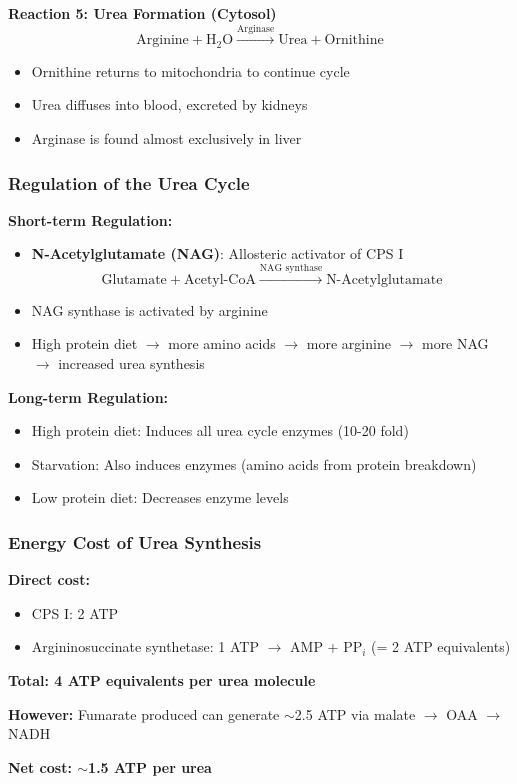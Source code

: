 \textbf{Reaction 5: Urea Formation (Cytosol)}
\[
\text{Arginine} + \text{H}_2\text{O} \xrightarrow{\text{Arginase}} \text{Urea} + \text{Ornithine}
\]
\begin{itemize}
    \item Ornithine returns to mitochondria to continue cycle
    \item Urea diffuses into blood, excreted by kidneys
    \item Arginase is found almost exclusively in liver
\end{itemize}

\subsubsection{Regulation of the Urea Cycle}

\textbf{Short-term Regulation:}
\begin{itemize}
    \item \textbf{N-Acetylglutamate (NAG)}: Allosteric activator of CPS I
    \[
    \text{Glutamate} + \text{Acetyl-CoA} \xrightarrow{\text{NAG synthase}} \text{N-Acetylglutamate}
    \]
    \item NAG synthase is activated by arginine
    \item High protein diet $\rightarrow$ more amino acids $\rightarrow$ more arginine $\rightarrow$ more NAG $\rightarrow$ increased urea synthesis
\end{itemize}

\textbf{Long-term Regulation:}
\begin{itemize}
    \item High protein diet: Induces all urea cycle enzymes (10-20 fold)
    \item Starvation: Also induces enzymes (amino acids from protein breakdown)
    \item Low protein diet: Decreases enzyme levels
\end{itemize}

\subsubsection{Energy Cost of Urea Synthesis}

\begin{tcolorbox}[colback=blue!5, colframe=blue!70!black, title=\textbf{ATP Cost of Urea Synthesis}]
\textbf{Direct cost:}
\begin{itemize}
    \item CPS I: 2 ATP
    \item Argininosuccinate synthetase: 1 ATP $\rightarrow$ AMP + PP$_i$ (= 2 ATP equivalents)
\end{itemize}

\textbf{Total: 4 ATP equivalents per urea molecule}

\textbf{However:} Fumarate produced can generate $\sim$2.5 ATP via malate $\rightarrow$ OAA $\rightarrow$ NADH

\textbf{Net cost: $\sim$1.5 ATP per urea}
\end{tcolorbox}

